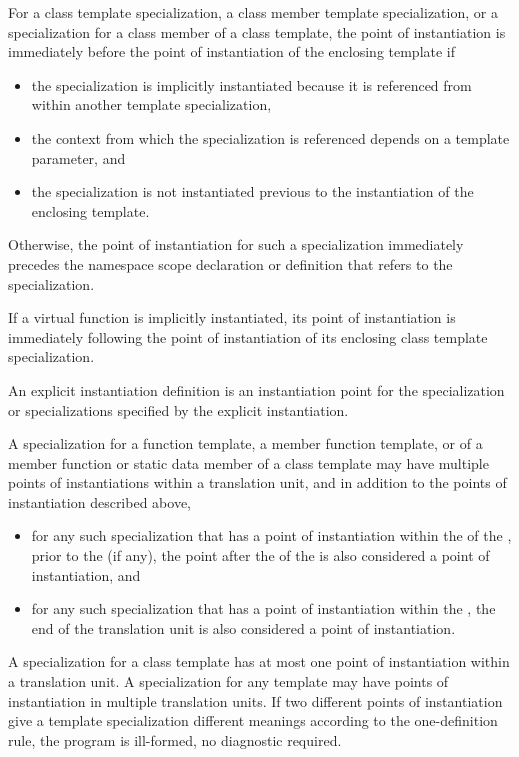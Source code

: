 \pnum
For a class template specialization, a class member template specialization,
or a specialization for a class member of a class template,
the point of instantiation is immediately before the point of instantiation of
the enclosing template if
\begin{itemize}
\item the specialization is implicitly instantiated
because it is referenced from within another template specialization,
\item the context from which the specialization is referenced
depends on a template parameter, and
\item the specialization is not instantiated
previous to the instantiation of the enclosing template.
\end{itemize}
Otherwise, the point of instantiation for such a specialization immediately
precedes the namespace scope declaration
or definition that refers to the specialization.

\pnum
If a virtual function is implicitly instantiated, its point of instantiation
is immediately following the point of instantiation of its enclosing class
template specialization.

\pnum
An explicit instantiation definition is an instantiation
point for the specialization or specializations specified by the explicit
instantiation.

\pnum
A specialization for a function template, a member function template,
or of a member function or static data member of a class template may have
multiple points of instantiations within a translation unit, and in addition
to the points of instantiation described above,
\begin{itemize}
\item
for any such
specialization that has a point of instantiation within the
 of the
,
prior to the  (if any),
the point after the 
of the 
is also considered a point of instantiation,
and
\item
for any such specialization that has a point of instantiation
within the ,
the end of the translation unit is also
considered a point of instantiation.
\end{itemize}
A specialization for a class template has at most one point of instantiation
within a translation unit.
A specialization for any template may have points of instantiation in multiple
translation units.
If two different points of instantiation give a template specialization
different meanings according to the one-definition rule,
the program is ill-formed, no diagnostic required.

